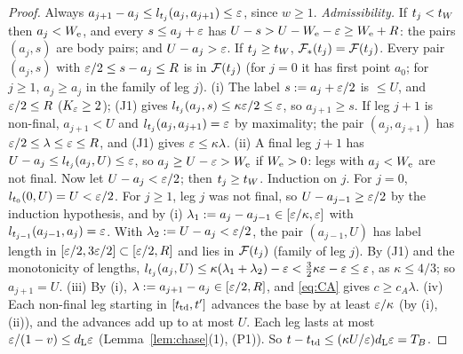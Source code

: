 \begin{proof}
Always $a_{j+1}-a_j\le l_{t_j}(a_j,a_{j+1})\le\varepsilon$, since $w\ge1$. \emph{Admissibility.} If $t_j<t_W$ then $a_j<W_{\mathrm e}$, and every
$s\le a_j+\varepsilon$ has $U-s>U-W_{\mathrm e}-\varepsilon\ge W_{\mathrm e}+R$: the pairs $(a_j,s)$ are body pairs; and $U-a_j>\varepsilon$. If $t_j\ge t_W$,
$\mathcal F_*(t_j)=\mathcal F(t_j)$. Every pair $(a_j,s)$ with $\varepsilon/2\le s-a_j\le R$ is in $\mathcal F(t_j)$ (for $j=0$ it has first point $a_0$; for
$j\ge1$, $a_j\ge a_j$ in the family of leg $j$).
(i) The label $s:=a_j+\varepsilon/2$ is $\le U$, and $\varepsilon/2\le R$ ($K_\varepsilon\ge2$); (J1) gives $l_{t_j}(a_j,s)\le\kappa\varepsilon/2\le\varepsilon$, so
$a_{j+1}\ge s$. If leg $j+1$ is non-final, $a_{j+1}<U$ and $l_{t_j}(a_j,a_{j+1})=\varepsilon$ by maximality; the pair $(a_j,a_{j+1})$ has
$\varepsilon/2\le\lambda\le\varepsilon\le R$, and (J1) gives $\varepsilon\le\kappa\lambda$.
(ii) A final leg $j+1$ has $U-a_j\le l_{t_j}(a_j,U)\le\varepsilon$, so $a_j\ge U-\varepsilon>W_{\mathrm e}$ if $W_{\mathrm e}>0$: legs with $a_j<W_{\mathrm e}$ are not final.
Now let $U-a_j<\varepsilon/2$; then $t_j\ge t_W$. Induction on $j$. For $j=0$, $l_{t_0}(0,U)=U<\varepsilon/2$. For $j\ge1$, leg $j$ was not final, so
$U-a_{j-1}\ge\varepsilon/2$ by the induction hypothesis, and by (i) $\lambda_1:=a_j-a_{j-1}\in[\varepsilon/\kappa,\varepsilon]$ with
$l_{t_{j-1}}(a_{j-1},a_j)=\varepsilon$. With $\lambda_2:=U-a_j<\varepsilon/2$, the pair $(a_{j-1},U)$ has label length in $[\varepsilon/2,3\varepsilon/2]\subset
[\varepsilon/2,R]$ and lies in $\mathcal F(t_j)$ (family of leg $j$). By (J1) and the monotonicity of lengths,
$l_{t_j}(a_j,U)\le\kappa(\lambda_1+\lambda_2)-\varepsilon<\frac32\kappa\varepsilon-\varepsilon\le\varepsilon$, as $\kappa\le4/3$; so $a_{j+1}=U$.
(iii) By (i), $\lambda:=a_{j+1}-a_j\in[\varepsilon/2,R]$, and \eqref{eq:CA} gives $c\ge c_A\lambda$.
(iv) Each non-final leg starting in $[t_{\mathrm{td}},t']$ advances the base by at least $\varepsilon/\kappa$ (by (i), (ii)), and the advances add up to
at most $U$. Each leg lasts at most $\varepsilon/(1-v)\le d_{\mathrm L}\varepsilon$ (Lemma~\ref{lem:chase}(1), (P1)). So $t-t_{\mathrm{td}}\le(\kappa U/\varepsilon)d_{\mathrm L}\varepsilon=T_B$.
\end{proof}

